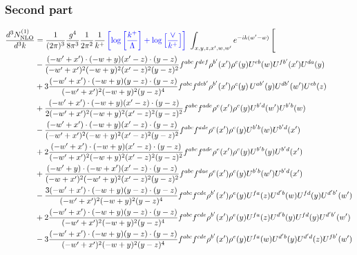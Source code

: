\documentclass[aps,prd,amsmath,amssymb,nofootinbib]{revtex4-2}
\numberwithin{equation}{section}
\begin{document}
\subsubsection{Second part}
\begin{align}
     \frac{d^{3}N^{(1)}_{\rm NLO}}{d^{3}k} & = \frac{1}{(2\pi)^{3}}\frac{g^{4}}{8\pi^{3}}\frac{1}{2\pi^{2}} \frac{1}{k^{+}}\,{\color{blue}\left[\log{\left[\frac{k^{+}}{\Lambda}\right]}+\log{\left[\frac{\vee}{k^{+}}\right]}\right]}\,\,\int_{x,y,z,x^{\prime},w,w^{\prime}}e^{-ik(w^{\prime}-w)}\, \Bigg[\notag \\ & - \frac{( - w' + x') \cdot ( - w + y) (x' - z) \cdot (y - z)}{( - w' + x')^{2} ( - w + y)^{2} (x' - z)^{2} (y - z)^{2}} f^{a b c} f^{d e f} \rho^{b'}(x') \rho^{c}(y) U^{e b}(w) U^{fb'}(x') U^{d a}(y) \nonumber\\
      &+ 3 \frac{( - w' + x') \cdot ( - w + y) (y - z) \cdot (y - z)}{( - w' + x')^{2} ( - w + y)^{2} (y - z)^{4}} f^{a b c} f^{d e b'} \rho^{b'}(x') \rho^{c}(y) \, U^{a b'}(y) U^{d b'}(w') U^{e b}(z)\nonumber\\
    &+\frac{( - w' + x') \cdot ( - w + y) (x' - z) \cdot (y - z)}{2 ( - w' + x')^{2} ( - w + y)^{2} (x' - z)^{2} (y - z)^{2}} f^{a b c} f^{a d e} \rho^{e}(x') \rho^{c}(y) U^{b'd}(w') U^{b' b}(w)\nonumber\\
    &- \frac{( - w' + x') \cdot ( - w + y) (x' - z) \cdot (y - z)}{( - w' + x')^{2} ( - w + y)^{2} (x' - z)^{2} (y - z)^{2}} f^{a b c} f^{a d e} \rho^{e}(x') \rho^{c}(y) U^{b' b}(w) U^{b' d}(x')\nonumber\\
    &+ 2 \frac{( - w' + x') \cdot ( - w + y) (x' - z) \cdot (y - z)}{( - w' + x')^{2} ( - w + y)^{2} (x' - z)^{2} (y - z)^{2}} f^{a b c} f^{a d e} \rho^{e}(x') \rho^{c}(y) U^{b' b}(y) U^{b' d}(x')\nonumber\\
    &+ \frac{( - w' + y) \cdot ( - w + x') (x' - z) \cdot (y - z)}{( - w + x')^{2} ( - w' + y)^{2} (x' - z)^{2} (y - z)^{2}} f^{a b c} f^{d a e} \rho^{e}(x') \rho^{c}(y) U^{b' b}(w') U^{b' d}(x')\nonumber\\
    &-\frac{3 ( - w' + x') \cdot ( - w + y) (y - z) \cdot (y - z)}{( - w' + x')^{2} ( - w + y)^{2} (y - z)^{4}} f^{a b c} f^{c d e} \rho^{b'}(x') \rho^{e}(y) U^{fa}(z) U^{d'b}(w) U^{fd}(y) U^{d'b'}(w')\nonumber\\
    &+ 2 \frac{( - w' + x') \cdot ( - w + y) (y - z) \cdot (y - z)}{( - w' + x')^{2} ( - w + y)^{2} (y - z)^{4}} f^{a b c} f^{c d e} \rho^{b'}(x') \rho^{e}(y) U^{fa}(z) U^{d'b}(y) U^{fd}(y) U^{d'b'}(w')\nonumber\\
    &- 3 \frac{( - w' + x') \cdot ( - w + y) (y - z) \cdot (y - z)}{( - w' + x')^{2} ( - w + y)^{2} (y - z)^{4}} f^{a b c} f^{c d e} \rho^{b'}(x') \rho^{e}(y) U^{fa}(w) U^{d'b}(y) U^{d'd}(z) U^{fb'}(w')\nonumber\\

\end{align}
\end{document}
